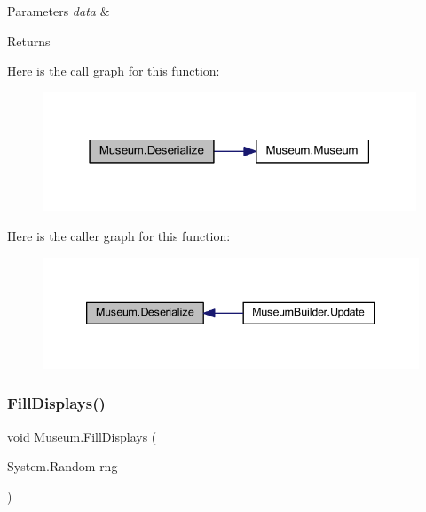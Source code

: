 \begin{DoxyParams}{Parameters}
{\em data} & \\
\hline
\end{DoxyParams}
\begin{DoxyReturn}{Returns}

\end{DoxyReturn}
Here is the call graph for this function\+:
\nopagebreak
\begin{figure}[H]
\begin{center}
\leavevmode
\includegraphics[width=316pt]{class_museum_a1b4fb627a19112e3ba3d25e8108de2c3_cgraph}
\end{center}
\end{figure}
Here is the caller graph for this function\+:
\nopagebreak
\begin{figure}[H]
\begin{center}
\leavevmode
\includegraphics[width=339pt]{class_museum_a1b4fb627a19112e3ba3d25e8108de2c3_icgraph}
\end{center}
\end{figure}
\mbox{\label{class_museum_ae07741bc8fd7f97c84fed0050e18c3c4}} 
\subsubsection{\texorpdfstring{Fill\+Displays()}{FillDisplays()}}
{\footnotesize\ttfamily void Museum.\+Fill\+Displays (\begin{DoxyParamCaption}\item[{System.\+Random}]{rng }\end{DoxyParamCaption})\hspace{0.3cm}{\ttfamily [private]}}



